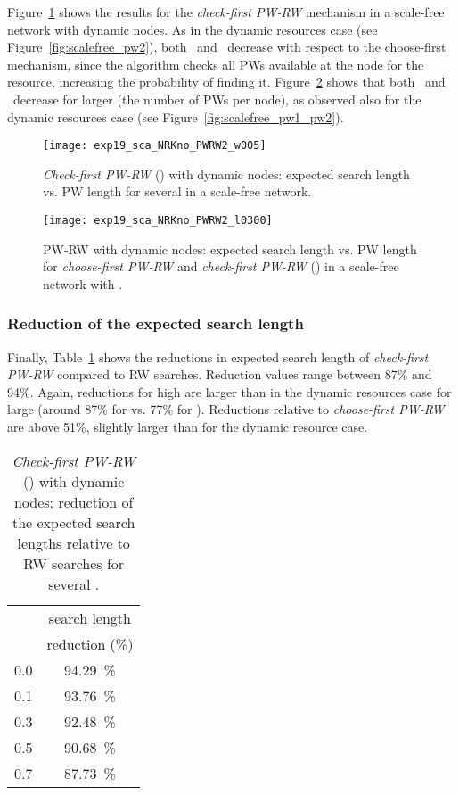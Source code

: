 \documentclass[]{elsarticle}
\begin{document}
Figure~\ref{fig:scalefree_pw2_dynnodes} shows the results for the \emph{check-first PW-RW} mechanism in a scale-free network with dynamic nodes. As in the dynamic resources case (see Figure~\ref{fig:scalefree_pw2}), both \sopt\ and \Lexpopt\ decrease with respect to the choose-first mechanism, since the algorithm checks all PWs available at the node for the resource, increasing the probability of finding it. Figure~\ref{fig:scalefree_pw1_pw2_dynnodes} shows that both \Lexpopt\ and \sopt\ decrease for larger  (the number of PWs per node), as observed also for the dynamic resources case (see Figure~\ref{fig:scalefree_pw1_pw2}). \\
\begin{figure}
 \centering
 \texttt{[image: exp19\_sca\_NRKno\_PWRW2\_w005]}
 \caption{\emph{Check-first PW-RW} () with dynamic nodes: expected search length  vs. PW length  for several  in a scale-free network.}
 \label{fig:scalefree_pw2_dynnodes}
\end{figure}
\begin{figure}
 \centering
 \texttt{[image: exp19\_sca\_NRKno\_PWRW2\_l0300]}
 \caption{PW-RW with dynamic nodes: expected search length  vs. PW length  for \emph{choose-first PW-RW} and \emph{check-first PW-RW} () in a scale-free network with .}
 \label{fig:scalefree_pw1_pw2_dynnodes}
\end{figure}


\subsubsection{Reduction of the expected search length}

Finally, Table~\ref{tab:H_reduction_RW_PWRW2_dynnodes} shows the reductions in expected search length of \emph{check-first PW-RW} compared to RW searches. Reduction values range between 87\% and 94\%. Again, reductions for high  are larger than in the dynamic resources case for large  (around 87\% for  vs. 77\% for ). Reductions relative to \emph{choose-first PW-RW} are above 51\%, slightly larger than for the dynamic resource case.
\begin{table}
\centering
\begin{tabular}{|c|c|}
\hline
\rule{0pt}{11pt}   & search length \\ 
                & reduction (\%)\\ \hline
              0.0  &  94.29~\% \\
              0.1  & 93.76~\% \\
              0.3  & 92.48~\% \\
              0.5  & 90.68~\% \\
              0.7  & 87.73~\% \\
\hline
\end{tabular}
\caption{\emph{Check-first PW-RW} () with dynamic nodes: reduction of the expected search lengths relative to RW searches for several .}
\label{tab:H_reduction_RW_PWRW2_dynnodes}
\end{table}
\end{document}

